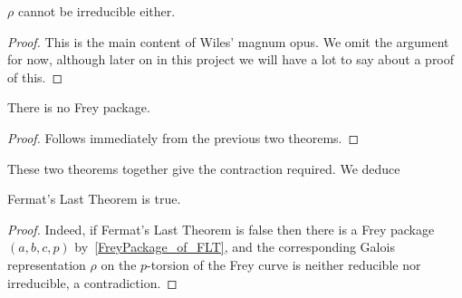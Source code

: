 \begin{theorem}\label{Wiles_on_Frey_curve}\leanok $\rho$ cannot be irreducible either.\end{theorem}
\begin{proof}\tangled This is the main content of Wiles' magnum opus. We omit the argument for now, although later on in this project we will have a lot to say about a proof of this.
\end{proof}

\begin{corollary}\label{no_Frey_package}\leanok There is no Frey package.\end{corollary}
\begin{proof}\leanok Follows immediately from the previous two theorems.\end{proof}

These two theorems together give the contraction required. We deduce

\begin{corollary}\label{FLT}\leanok Fermat's Last Theorem is true.\end{corollary}
\begin{proof}\leanok
Indeed, if Fermat's Last Theorem is false then there is a Frey package $(a,b,c,p)$ by~\ref{FreyPackage_of_FLT}, and the corresponding Galois representation $\rho$ on the $p$-torsion of the Frey curve is neither reducible nor irreducible, a contradiction.
\end{proof}
